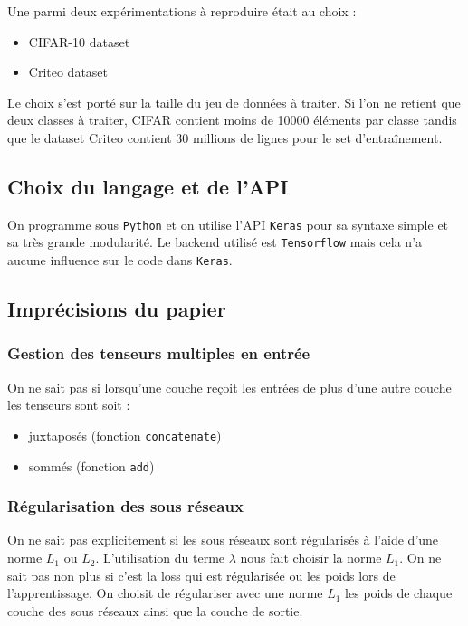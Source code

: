 \documentclass[11 pt]{article}
\begin{document}
	Une parmi deux expérimentations à reproduire était au choix : 
	\begin{itemize}
		\item CIFAR-10 dataset
		\item Criteo dataset
	\end{itemize}

	Le choix s'est porté sur la taille du jeu de données à traiter. Si l'on ne retient que deux classes à traiter, CIFAR contient moins de 10000 éléments par classe tandis que le dataset Criteo contient 30 millions de lignes pour le set d'entraînement.

\subsection{Choix du langage et de l'API}
	On programme sous \texttt{Python} et on utilise l'API \texttt{Keras} pour sa syntaxe simple et sa très grande modularité. Le backend utilisé est \texttt{Tensorflow} mais cela n'a aucune influence sur le code dans \texttt{Keras}.

\subsection{Imprécisions du papier}

\subsubsection{Gestion des tenseurs multiples en entrée}
\label{subsec:mult}
On ne sait pas si lorsqu'une couche reçoit les entrées de plus d'une autre couche les tenseurs sont soit :
\begin{itemize}
	\item juxtaposés (fonction \texttt{concatenate})
	\item sommés (fonction \texttt{add})
\end{itemize}

\subsubsection{Régularisation des sous réseaux}
On ne sait pas explicitement si les sous réseaux sont régularisés à l'aide d'une norme $L_{1}$ ou $L_{2}$. L'utilisation du terme $\lambda$ nous fait choisir la norme $L_{1}$. On ne sait pas non plus si c'est la loss qui est régularisée ou les poids lors de l'apprentissage. On choisit de régulariser avec une norme $L_{1}$ les poids de chaque couche des sous réseaux ainsi que la couche de sortie.
\end{document}
